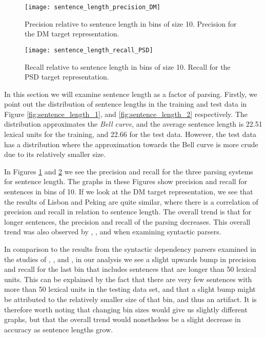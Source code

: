 \begin{figure}[h]
    \centering
    \begin{minipage}{0.8\textwidth}
        \centering
        \texttt{[image: sentence\_length\_precision\_DM]}
    \end{minipage}
    \caption{Precision relative to sentence length in bins of size 10. Precision for the DM target representation.}
    \label{fig:s_length_DM}
\end{figure}

\begin{figure}[h]
    \centering
    \begin{minipage}{0.8\textwidth}
        \centering
        \texttt{[image: sentence\_length\_recall\_PSD]}
    \end{minipage}\hfill
    \caption{Recall relative to sentence length in bins of size 10. Recall for the PSD target representation.}
    \label{fig:s_length_PSD}
\end{figure}

In this section we will examine sentence length as a factor of parsing. Firstly, we point out the distribution of sentence lengths in the training and test data in Figure \ref{fig:sentence_length_1}, and \ref{fig:sentence_length_2} respectively. The distribution approximates the \textit{Bell curve}, and the average sentence length is 22.51 lexical units for the training, and 22.66 for the test data. However, the test data has a distribution where the approximation towards the Bell curve is more crude due to its relatively smaller size.

In Figures \ref{fig:s_length_DM} and \ref{fig:s_length_PSD} we see the precision and recall for the three parsing systems for sentence length. The graphs in these Figures show precision and recall for sentences in bins of 10. If we look at the DM target representation, we see that the results of Lisbon and Peking are quite similar, where there is a correlation of precision and recall in relation to sentence length. The overall trend is that for longer sentences, the precision and recall of the parsing decreases. This overall trend was also observed by , , and  when examining syntactic parsers.

In comparison to the results from the syntactic dependency parsers examined in the studies of , , and , in our analysis we see a slight upwards bump in precision and recall for the last bin that includes sentences that are longer than 50 lexical units. This can be explained by the fact that there are very few sentences with more than 50 lexical units in the testing data set, and that a slight bump might be attributed to the relatively smaller size of that bin, and thus an artifact. It is therefore worth noting that changing bin sizes would give us slightly different graphs, but that the overall trend would nonetheless be a slight decrease in accuracy as sentence lengths grow.

